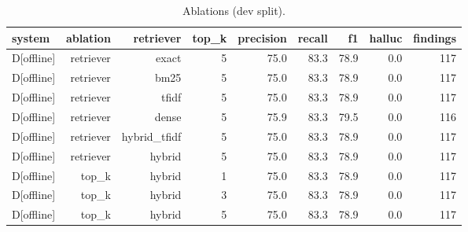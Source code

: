 \begin{table}[t]
\centering
\small
\caption{Ablations (dev split).}
\label{tab:ablations-dev}
\begin{tabular}{lrrrrrrrr}
\toprule
system & ablation & retriever & top\_k & precision & recall & f1 & halluc & findings \\
\midrule
D[offline] & retriever & exact & 5 & 75.0 & 83.3 & 78.9 & 0.0 & 117 \\
D[offline] & retriever & bm25 & 5 & 75.0 & 83.3 & 78.9 & 0.0 & 117 \\
D[offline] & retriever & tfidf & 5 & 75.0 & 83.3 & 78.9 & 0.0 & 117 \\
D[offline] & retriever & dense & 5 & 75.9 & 83.3 & 79.5 & 0.0 & 116 \\
D[offline] & retriever & hybrid\_tfidf & 5 & 75.0 & 83.3 & 78.9 & 0.0 & 117 \\
D[offline] & retriever & hybrid & 5 & 75.0 & 83.3 & 78.9 & 0.0 & 117 \\
D[offline] & top\_k & hybrid & 1 & 75.0 & 83.3 & 78.9 & 0.0 & 117 \\
D[offline] & top\_k & hybrid & 3 & 75.0 & 83.3 & 78.9 & 0.0 & 117 \\
D[offline] & top\_k & hybrid & 5 & 75.0 & 83.3 & 78.9 & 0.0 & 117 \\
\bottomrule
\end{tabular}
\end{table}
